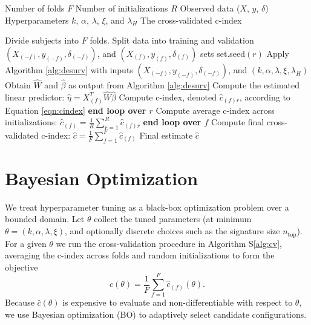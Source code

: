 \documentclass[
]{article}
\begin{document}
\begin{algorithm}[H]
\caption{Cross-validation for DeSurv pipeline}
\label{alg:cv}
\begin{algorithmic}[1]
\Require 
\Statex Number of folds $F$
\Statex Number of initializations $R$
\Statex Observed data ($X$, $y$, $\delta$)
\Statex Hyperparameters $k$, $\alpha$, $\lambda$, $\xi$, and $\lambda_H$
\Ensure The cross-validated c-index

\State Divide subjects into $F$ folds.
    \State Split data into training and validation $(X_{(-f)},y_{(-f)}, \delta_{(-f)})$, and $(X_{(f)},y_{(f)}, \delta_{(f)})$ sets
        \State set.seed$(r)$
        \State Apply Algorithm \ref{alg:desurv} with inputs $(X_{(-f)},y_{(-f)}, \delta_{(-f)})$, and $(k, \alpha, \lambda, \xi, \lambda_H)$
        \State Obtain $\hat{W}$ and $\hat{\beta}$ as output from Algorithm \ref{alg:desurv}
        \State Compute the estimated linear predictor: 
        $
        \hat{\eta} = X_{(f)}^T\hat{W}\hat{\beta}
        $
        \State Compute c-index, denoted $\hat{c}_{(f)r}$, according to Equation \ref{eqn:cindex}
    \EndFor
    \State \textbf{end loop over $r$}
    \State Compute average c-index across initializations:
    $
    \hat{c}_{(f)} = \frac{1}{R}\sum_{r=1}^R\hat{c}_{(f)r}
    $
\EndFor
\State \textbf{end loop over $f$}
\State Compute final cross-validated c-index:
$
\hat{c} = \frac{1}{F}\sum_{f=1}^F \hat{c}_{(f)}
$
\State \Return Final estimate $\hat{c}$

\end{algorithmic}
\end{algorithm}

\section{Bayesian Optimization}

We treat hyperparameter tuning as a black-box optimization problem over
a bounded domain. Let \(\theta\) collect the tuned parameters (at
minimum \(\theta = (k,\alpha,\lambda,\xi)\), and optionally discrete
choices such as the signature size \(n_{\text{top}}\)). For a given
\(\theta\) we run the cross-validation procedure in Algorithm
S\ref{alg:cv}, averaging the c-index across folds and random
initializations to form the objective \[
\hat{c}(\theta) = \frac{1}{F} \sum_{f=1}^F \hat{c}_{(f)}(\theta).
\] Because \(\hat{c}(\theta)\) is expensive to evaluate and
non-differentiable with respect to \(\theta\), we use Bayesian
optimization (BO) to adaptively select candidate configurations.
\end{document}
